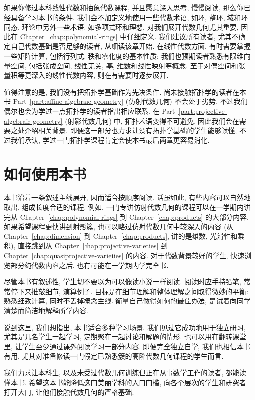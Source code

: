 如果你修过本科线性代数和抽象代数课程, 并且愿意深入思考, 慢慢阅读, 那么你已经具备学习本书的条件. 我们会不加定义地使用一些代数术语, 如环, 整环, 域和环同态. 环论中另外一些术语, 如多项式环和理想, 对我们展开代数几何尤其重要, 因此在 Chapter~\ref{chap:polynomial-rings} 中仔细定义. 我们建议所有读者, 尤其不确定自己代数基础是否足够的读者, 从细读该章开始. 在线性代数方面, 有时需要掌握一些矩阵计算, 包括行列式, 秩和零化度的基本性质; 我们也预期读者熟悉有限维向量空间, 包括张成空间, 线性无关, 基, 维数和线性映射等概念. 至于对偶空间和张量积等更深入的线性代数内容, 则在有需要时逐步展开.

值得注意的是, 我们没有把拓扑学基础作为先决条件. 尚未接触拓扑学的读者在本书 Part~\ref{part:affine-algebraic-geometry} (仿射代数几何) 不会处于劣势, 不过我们偶尔也会为学过一点拓扑学的读者指出相应联系. 在 Part~\ref{part:projective-algebraic-geometry} (射影代数几何) 中, 拓扑术语变得不可避免, 因此我们会在需要之处介绍相关背景. 即便这一部分也力求让没有拓扑学基础的学生能够读懂, 不过我们承认, 学过一门拓扑学课程肯定会使本书最后两章更容易消化.

\section*{如何使用本书}

本书沿着一条叙述主线展开, 因而适合按顺序阅读. 话虽如此, 有些内容可以自然地取出, 组成长度合适的课程. 例如, 一门专讲仿射代数几何的课程可以在一学期内讲完从 Chapter~\ref{chap:polynomial-rings} 到 Chapter~\ref{chap:products} 的大部分内容. 如果希望课程更快讲到射影簇, 也可以略过仿射代数几何中较深入的内容 (从 Chapter~\ref{chap:dimension} 到 Chapter~\ref{chap:products}, 讲的是维数, 光滑性和乘积), 直接跳到从 Chapter~\ref{chap:projective-varieties} 到 Chapter~\ref{chap:quasiprojective-varieties} 的内容. 对于代数背景较好的学生, 快速浏览部分纯代数内容之后, 也有可能在一学期内学完全书.

尽管本书有叙述性, 学生切不要以为可以像读小说一样阅读. 阅读时应手持铅笔, 常常停下来推敲细节, 演算例子. 目标是在细节理解和整体理解之间取得微妙的平衡: 熟悉细致计算, 同时不丢掉概念主线. 衡量自己做得如何的最佳办法, 是试着向同学清楚而简洁地解释所学内容.

说到这里, 我们想指出, 本书适合多种学习场景. 我们见过它成功地用于独立研习, 尤其是几名学生一起学习, 定期聚在一起讨论和解题的情形. 也可以用在翻转课堂里, 让学生至少通过课外阅读学习一部分内容. 即便完全独立自学, 我们也相信本书有用, 尤其对准备修读一门假定已熟悉簇的高阶代数几何课程的学生而言.

我们力求让本科生, 以及未受过代数几何训练但正在从事数学工作的读者, 都能读懂本书. 希望这本书能降低这门美丽学科的入门门槛, 向各个层次的学生和研究者打开大门, 让他们接触代数几何的严格基础.

